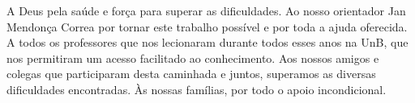 A Deus pela saúde e força para superar as dificuldades.
Ao nosso orientador Jan Mendonça Correa por tornar este trabalho possível e por toda a ajuda oferecida.
A todos os professores que nos lecionaram durante todos esses anos na UnB, que nos permitiram um acesso facilitado ao conhecimento.
Aos nossos amigos e colegas que participaram desta caminhada e juntos, superamos as diversas dificuldades encontradas.
Às nossas famílias, por todo o apoio incondicional.